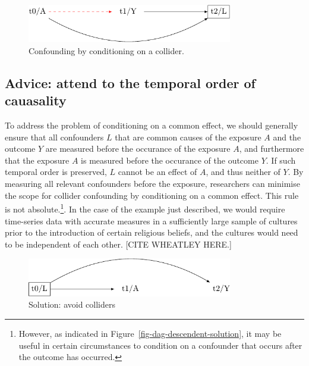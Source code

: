 \documentclass[
  singlecolumn]{report}
\begin{document}
\begin{figure}

{\centering \includegraphics[width=0.8\textwidth,height=\textheight]{causal-dags_files/figure-pdf/fig-dag-common-effect-1.pdf}

}

\caption{\label{fig-dag-common-effect}Confounding by conditioning on a
collider.}

\end{figure}

\hypertarget{advice-attend-to-the-temporal-order-of-cauasality-1}{%
\subsection{Advice: attend to the temporal order of
cauasality}\label{advice-attend-to-the-temporal-order-of-cauasality-1}}

To address the problem of conditioning on a common effect, we should
generally ensure that all confounders \(L\) that are common causes of
the exposure \(A\) and the outcome \(Y\) are measured before the
occurance of the exposure \(A\), and furthermore that the exposure \(A\)
is measured before the occurance of the outcome \(Y\). If such temporal
order is preserved, \(L\) cannot be an effect of \(A\), and thus neither
of \(Y\). By measuring all relevant confounders before the exposure,
researchers can minimise the scope for collider confounding by
conditioning on a common effect. This rule is not absolute.\footnote{However,
  as indicated in Figure~\ref{fig-dag-descendent-solution}, it may be
  useful in certain circumstances to condition on a confounder that
  occurs after the outcome has occurred.}. In the case of the example
just described, we would require time-series data with accurate measures
in a sufficiently large sample of cultures prior to the introduction of
certain religious beliefs, and the cultures would need to be independent
of each other. {[}CITE WHEATLEY HERE.{]}

\begin{figure}

{\centering \includegraphics[width=0.8\textwidth,height=\textheight]{causal-dags_files/figure-pdf/fig-dag-common-effect-solution-1.pdf}

}

\caption{\label{fig-dag-common-effect-solution}Solution: avoid
colliders}

\end{figure}
\end{document}
